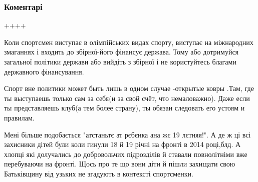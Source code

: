  
 
 
 
 
\subsubsection{Коментарі}

\begin{itemize}
 
++++

 

Коли спортсмен виступає в олімпійських видах спорту, виступає на міжнародних
змаганнях і входить до збірної-його фінансує держава. Тому або дотримуйся
загальної політики держави або вийдіть з збірної і не користуйтесь благами
державного фінансування.


 

Спорт вне политики может быть лишь в одном случае -открытые ковры .Там, где ты
выступаешь только сам за себя(и за свой счёт, что немаловажно). Даже если ты
представляешь клуб(а тем более страну), ты обязан следовать его устоям и
правилам.


 

Мені більше подобається "атстаньтє ат рєбєнка ана жє 19 лєтняя!". А де ж ці всі
захисники дітей були коли гинули 18 й 19 річні на фронті в 2014 році,блд. А
хлопці які долучались до добровольчих підрозділів й ставали повнолітніми вже
перебуваючи на фронті. Щось про те що вони діти й пішли захищати свою
Батьківщину від узьких не згадують в контексті спортсменки.


\end{itemize}
